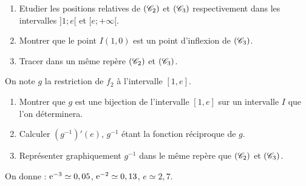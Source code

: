 \begin{description}
\begin{description}
\begin{enumerate}
                                    \item Etudier les positions relatives de $(\mathscr{C}_2)$ et $(\mathscr{C}_3)$ respectivement
                                          dans les intervalles $]1;e[$ et $[e;+\infty[$.
                                    \item Montrer que le point $I(1,0)$ est un point d'inflexion de $(\mathscr{C}_3)$.
                                    \item Tracer dans un m\^eme rep\`ere $(\mathscr{C}_2)$ et $(\mathscr{C}_3)$.
                              \end{enumerate}
                        \item[III. ]
                              On note $g$ la restriction de $f_2$ \`a l'intervalle $[1,e]$.
                              \begin{enumerate}
                                    \item Montrer que $g$ est une bijection de l'intervalle $[1,e]$ sur un intervalle $I$
                                          que l'on d\'eterminera.
                                    \item Calculer $\left(g^{-1}\right)' (e)$, $g^{-1}$ \'etant la fonction r\'eciproque de $g$.
                                    \item Repr\'esenter graphiquement $g^{-1}$ 
                                          dans le m\^eme rep\`ere que $(\mathscr{C}_2)$ et $(\mathscr{C}_3)$.
                              \end{enumerate}
                  \end{description}
                  \begin{center}
                        On donne : $\mathrm{e}^{-3} \simeq 0,05$, $\mathrm{e}^{-2} \simeq 0,13$, $e \simeq 2,7$.
                  \end{center}
      \end{description}

































